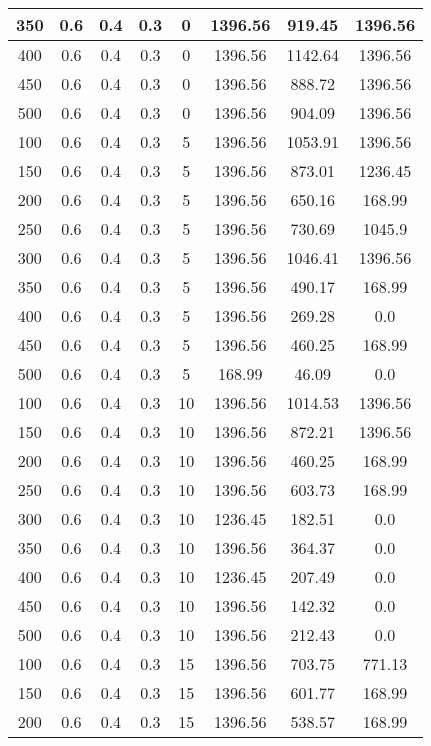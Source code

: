 \documentclass[a4paper, 12pt]{extreport}
\begin{document}
\begin{itemize}
\begin{longtable}{|c|c|c|c|c|c|c|c|}
			350 & 0.6 & 0.4 & 0.3 & 0 & 1396.56 & 919.45 & 1396.56 \\\hline
			400 & 0.6 & 0.4 & 0.3 & 0 & 1396.56 & 1142.64 & 1396.56 \\\hline
			450 & 0.6 & 0.4 & 0.3 & 0 & 1396.56 & 888.72 & 1396.56 \\\hline
			500 & 0.6 & 0.4 & 0.3 & 0 & 1396.56 & 904.09 & 1396.56 \\\hline
			100 & 0.6 & 0.4 & 0.3 & 5 & 1396.56 & 1053.91 & 1396.56 \\\hline
			150 & 0.6 & 0.4 & 0.3 & 5 & 1396.56 & 873.01 & 1236.45 \\\hline
			200 & 0.6 & 0.4 & 0.3 & 5 & 1396.56 & 650.16 & 168.99 \\\hline
			250 & 0.6 & 0.4 & 0.3 & 5 & 1396.56 & 730.69 & 1045.9 \\\hline
			300 & 0.6 & 0.4 & 0.3 & 5 & 1396.56 & 1046.41 & 1396.56 \\\hline
			350 & 0.6 & 0.4 & 0.3 & 5 & 1396.56 & 490.17 & 168.99 \\\hline
			400 & 0.6 & 0.4 & 0.3 & 5 & 1396.56 & 269.28 & 0.0 \\\hline
			450 & 0.6 & 0.4 & 0.3 & 5 & 1396.56 & 460.25 & 168.99 \\\hline
			500 & 0.6 & 0.4 & 0.3 & 5 & 168.99 & 46.09 & 0.0 \\\hline
			100 & 0.6 & 0.4 & 0.3 & 10 & 1396.56 & 1014.53 & 1396.56 \\\hline
			150 & 0.6 & 0.4 & 0.3 & 10 & 1396.56 & 872.21 & 1396.56 \\\hline
			200 & 0.6 & 0.4 & 0.3 & 10 & 1396.56 & 460.25 & 168.99 \\\hline
			250 & 0.6 & 0.4 & 0.3 & 10 & 1396.56 & 603.73 & 168.99 \\\hline
			300 & 0.6 & 0.4 & 0.3 & 10 & 1236.45 & 182.51 & 0.0 \\\hline
			350 & 0.6 & 0.4 & 0.3 & 10 & 1396.56 & 364.37 & 0.0 \\\hline
			400 & 0.6 & 0.4 & 0.3 & 10 & 1236.45 & 207.49 & 0.0 \\\hline
			450 & 0.6 & 0.4 & 0.3 & 10 & 1396.56 & 142.32 & 0.0 \\\hline
			500 & 0.6 & 0.4 & 0.3 & 10 & 1396.56 & 212.43 & 0.0 \\\hline
			100 & 0.6 & 0.4 & 0.3 & 15 & 1396.56 & 703.75 & 771.13 \\\hline
			150 & 0.6 & 0.4 & 0.3 & 15 & 1396.56 & 601.77 & 168.99 \\\hline
			200 & 0.6 & 0.4 & 0.3 & 15 & 1396.56 & 538.57 & 168.99 \\\hline

\end{longtable}
\end{itemize}
\end{document}
